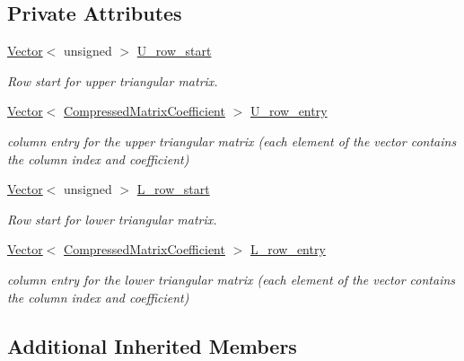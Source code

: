 \subsection*{Private Attributes}
\begin{DoxyCompactItemize}
\item 
\hyperlink{classoomph_1_1Vector}{Vector}$<$ unsigned $>$ \hyperlink{classoomph_1_1ILUZeroPreconditioner_3_01CRDoubleMatrix_01_4_a55c985417680ae5b26de020f6497cdfe}{U\+\_\+row\+\_\+start}
\begin{DoxyCompactList}\small\item\em Row start for upper triangular matrix. \end{DoxyCompactList}\item 
\hyperlink{classoomph_1_1Vector}{Vector}$<$ \hyperlink{classoomph_1_1CompressedMatrixCoefficient}{Compressed\+Matrix\+Coefficient} $>$ \hyperlink{classoomph_1_1ILUZeroPreconditioner_3_01CRDoubleMatrix_01_4_a459b5704ff4481a0875c36f743e235b0}{U\+\_\+row\+\_\+entry}
\begin{DoxyCompactList}\small\item\em column entry for the upper triangular matrix (each element of the vector contains the column index and coefficient) \end{DoxyCompactList}\item 
\hyperlink{classoomph_1_1Vector}{Vector}$<$ unsigned $>$ \hyperlink{classoomph_1_1ILUZeroPreconditioner_3_01CRDoubleMatrix_01_4_a8d89d3a259a7d8309b467c8cb0b1842c}{L\+\_\+row\+\_\+start}
\begin{DoxyCompactList}\small\item\em Row start for lower triangular matrix. \end{DoxyCompactList}\item 
\hyperlink{classoomph_1_1Vector}{Vector}$<$ \hyperlink{classoomph_1_1CompressedMatrixCoefficient}{Compressed\+Matrix\+Coefficient} $>$ \hyperlink{classoomph_1_1ILUZeroPreconditioner_3_01CRDoubleMatrix_01_4_acede3cb504db79c1e43635826d2328f7}{L\+\_\+row\+\_\+entry}
\begin{DoxyCompactList}\small\item\em column entry for the lower triangular matrix (each element of the vector contains the column index and coefficient) \end{DoxyCompactList}\end{DoxyCompactItemize}
\subsection*{Additional Inherited Members}


